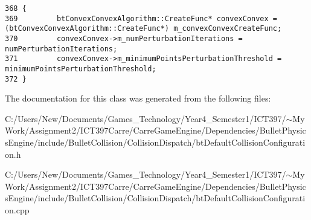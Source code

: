 \begin{Code}\begin{verbatim}368 {
369         btConvexConvexAlgorithm::CreateFunc* convexConvex = (btConvexConvexAlgorithm::CreateFunc*) m_convexConvexCreateFunc;
370         convexConvex->m_numPerturbationIterations = numPerturbationIterations;
371         convexConvex->m_minimumPointsPerturbationThreshold = minimumPointsPerturbationThreshold;
372 }
\end{verbatim}
\end{Code}




The documentation for this class was generated from the following files:\begin{CompactItemize}
\item 
C:/Users/New/Documents/Games\_\-Technology/Year4\_\-Semester1/ICT397/$\sim$My Work/Assignment2/ICT397Carre/CarreGameEngine/Dependencies/BulletPhysicsEngine/include/BulletCollision/CollisionDispatch/btDefaultCollisionConfiguration.h\item 
C:/Users/New/Documents/Games\_\-Technology/Year4\_\-Semester1/ICT397/$\sim$My Work/Assignment2/ICT397Carre/CarreGameEngine/Dependencies/BulletPhysicsEngine/include/BulletCollision/CollisionDispatch/btDefaultCollisionConfiguration.cpp\end{CompactItemize}
